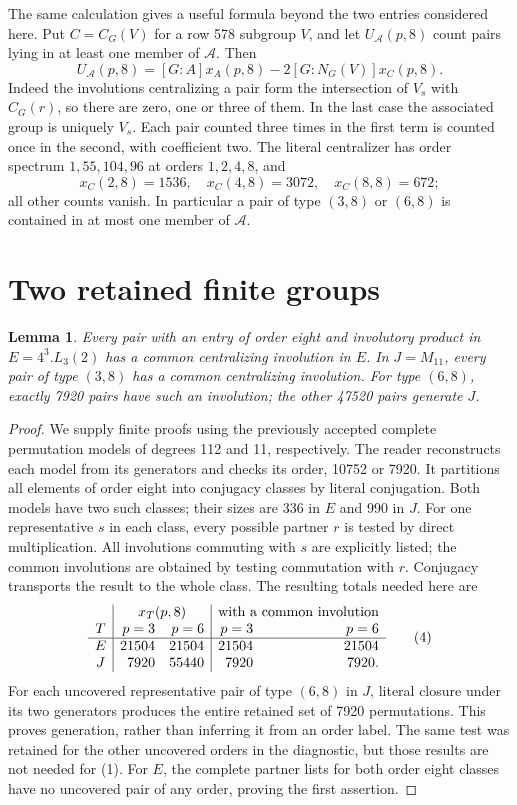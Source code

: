 \documentclass[11pt,a4paper]{article}
\newtheorem{lemma}{Lemma}\newtheorem{theorem}{Theorem}
\begin{document}
The same calculation gives a useful formula beyond the two entries
considered here. Put $C=C_G(V)$ for a row 578 subgroup $V$, and let
$U_{\mathcal A}(p,8)$ count pairs lying in at least one member of
$\mathcal A$. Then
\[
 U_{\mathcal A}(p,8)=[G:A]x_A(p,8)-2[G:N_G(V)]x_C(p,8).       \tag{3}
\]
Indeed the involutions centralizing a pair form the intersection of
$V_s$ with $C_G(r)$, so there are zero, one or three of them. In the last
case the associated group is uniquely $V_s$. Each pair counted three
times in the first term is counted once in the second, with coefficient
two. The literal centralizer has order spectrum
$1,55,104,96$ at orders $1,2,4,8$, and
\[
 x_C(2,8)=1536,\quad x_C(4,8)=3072,\quad x_C(8,8)=672;
\]
all other counts vanish. In particular a pair of type $(3,8)$ or $(6,8)$
is contained in at most one member of $\mathcal A$.

\section*{Two retained finite groups}
\begin{lemma}\label{finite}
Every pair with an entry of order eight and involutory product in
$E=4^3.L_3(2)$ has a common centralizing involution in $E$.
In $J=M_{11}$, every pair of type $(3,8)$ has a common centralizing
involution. For type $(6,8)$, exactly 7920 pairs have such an involution;
the other 47520 pairs generate $J$.
\end{lemma}
\begin{proof}
We supply finite proofs using the previously accepted complete
permutation models of degrees 112 and 11, respectively. The reader
reconstructs each model from its generators and checks its order,
10752 or 7920. It partitions all elements of order eight into conjugacy
classes by literal conjugation. Both models have two such classes;
their sizes are 336 in $E$ and 990 in $J$.
For one representative $s$ in each class, every possible partner $r$
is tested by direct multiplication. All involutions commuting with
$s$ are explicitly listed; the common involutions are obtained by
testing commutation with $r$. Conjugacy transports the result to the
whole class. The resulting totals needed here are
\[
\begin{array}{c|rr|rr}
 &\multicolumn{2}{c|}{x_T(p,8)}&
   \multicolumn{2}{c}{\text{with a common involution}}\\
 T&p=3&p=6&p=3&p=6\\\hline
 E&21504&21504&21504&21504\\
 J&7920&55440&7920&7920.
\end{array}                                                   \tag{4}
\]
For each uncovered representative pair of type $(6,8)$ in $J$, literal
closure under its two generators produces the entire retained set of
7920 permutations. This proves generation, rather than inferring it
from an order label. The same test was retained for the other uncovered
orders in the diagnostic, but those results are not needed for (1).
For $E$, the complete partner lists for both order eight classes have
no uncovered pair of any order, proving the first assertion.
\end{proof}
\end{document}

